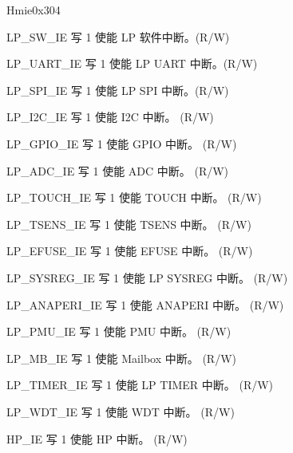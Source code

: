 \begin{register}{H}{mie}{0x304}\label{regdesc:LPMIE}
%
%
%
%
%
%
%
%
%
%
%
%
%
%
%
%
%
%
%
%
%
%
%
\regnewline%
\begin{regdesc}\begin{reglist}
\label{fielddesc:LPMIELPSWIE}\item [LP\_SW\_IE] 写 1 使能 LP 软件中断。(R/W)
\label{fielddesc:LPMILPUARTIE}\item [LP\_UART\_IE] 写 1 使能 LP UART 中断。(R/W)
\label{fielddesc:LPMIELPSPIIE}\item [LP\_SPI\_IE] 写 1 使能 LP SPI 中断。(R/W)
\label{fielddesc:LPMIEI2CIE}\item [LP\_I2C\_IE] 写 1 使能 I2C 中断。 (R/W)
\label{fielddesc:LPMIEGPIOIE}\item [LP\_GPIO\_IE] 写 1 使能 GPIO 中断。 (R/W)
\label{fielddesc:LPMIEADCIE}\item [LP\_ADC\_IE] 写 1 使能 ADC 中断。 (R/W)
\label{fielddesc:LPMIETOUCHIE}\item [LP\_TOUCH\_IE] 写 1 使能 TOUCH 中断。 (R/W)
\label{fielddesc:LPMIETSENSIE}\item [LP\_TSENS\_IE] 写 1 使能 TSENS 中断。 (R/W)
\label{fielddesc:LPMIEEFUSEIE}\item [LP\_EFUSE\_IE] 写 1 使能 EFUSE 中断。 (R/W)
\label{fielddesc:LPMIESYSREGIE}\item [LP\_SYSREG\_IE] 写 1 使能 LP SYSREG 中断。 (R/W)
\label{fielddesc:LPMIEANAPERIIE}\item [LP\_ANAPERI\_IE] 写 1 使能 ANAPERI 中断。 (R/W)
\label{fielddesc:LPMIEPMUIE}\item [LP\_PMU\_IE] 写 1 使能 PMU 中断。 (R/W)
\label{fielddesc:LPMIEMBIE}\item [LP\_MB\_IE] 写 1 使能 Mailbox 中断。 (R/W)
\label{fielddesc:LPMIETIMERIE}\item [LP\_TIMER\_IE] 写 1 使能 LP TIMER 中断。 (R/W)
\label{fielddesc:LPMIEWDTIE}\item [LP\_WDT\_IE] 写 1 使能 WDT 中断。 (R/W)
\label{fielddesc:LPMIEHPIE}\item [HP\_IE] 写 1 使能 HP 中断。 (R/W)
\end{reglist}\end{regdesc}
\end{register}


